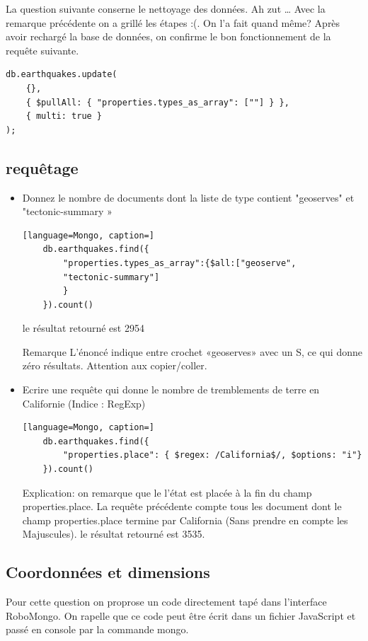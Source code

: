 La question suivante conserne le nettoyage des données.\newline
Ah zut … Avec la remarque précédente on a grillé les étapes :(.
On l’a fait quand même? \newline
Après avoir rechargé la base de données, on confirme le bon fonctionnement de la requête suivante.
\begin{lstlisting}[language=Mongo, caption=Nettoyage des données.]
db.earthquakes.update( 
    {},
    { $pullAll: { "properties.types_as_array": [""] } },
    { multi: true }
);
\end{lstlisting}

\subsection{requêtage}
    \begin{itemize}
    \item Donnez le nombre de documents dont la liste de type contient "geoserves" et "tectonic-summary » 
       \begin{lstlisting}[language=Mongo, caption=]
    db.earthquakes.find({
        "properties.types_as_array":{$all:["geoserve",
        "tectonic-summary"]
        }
    }).count()
\end{lstlisting}

le résultat retourné est 2954
\begin{block}{Remarque} L’énoncé indique entre crochet «geoserves» avec un S, ce qui donne zéro résultats. Attention aux copier/coller.
\end{block}


    \item Ecrire une requête qui donne le nombre de tremblements de terre en Californie (Indice : RegExp) 
       \begin{lstlisting}[language=Mongo, caption=]
    db.earthquakes.find({
        "properties.place": { $regex: /California$/, $options: "i"} 
    }).count()

\end{lstlisting}
Explication: on remarque que le l’état est placée à la fin du champ properties.place. La requête précédente compte tous les document dont le champ properties.place termine par California (Sans prendre en compte les Majuscules).\newline
le résultat retourné est 3535.
\end{itemize}

\subsection{Coordonnées et dimensions}
Pour cette question on proprose un code directement tapé dans l'interface RoboMongo. On rapelle que ce code peut être écrit dans un fichier JavaScript et passé en console par la commande mongo.

